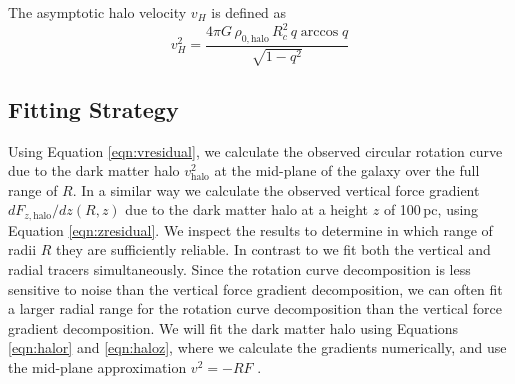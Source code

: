 \documentclass[useAMS,usenatbib]{mn2e}
\begin{document}
The asymptotic halo velocity $v_H$ is defined as 
\begin{equation}
v_H^2 = \frac{4\pi G\,\rho_{0,\textrm{halo}} \,R_c^2\, q \arccos q}{\sqrt{1-q^2}}\label{eqn:dmhalovelocity}
\end{equation}



\subsection{Fitting Strategy}

Using Equation \ref{eqn:vresidual}, we calculate the observed circular 
rotation curve due to the dark matter halo $v_\textrm{halo}^2$ at the 
mid-plane of the galaxy over the full range of $R$.
In a similar way we calculate the observed vertical force gradient  
$dF_{z,\textrm{halo}}/dz(R,z)$ due to the dark matter halo at a height $z$ 
of 100\,pc, using Equation \ref{eqn:zresidual}.
We inspect the results to determine in which range of radii $R$ they 
are sufficiently reliable.
In contrast to \citet{OBrien2010D} we fit both the vertical and radial 
tracers simultaneously.
Since the rotation curve decomposition is less sensitive to noise than 
the vertical force gradient decomposition, we can often fit a larger 
radial range for the rotation curve decomposition  than the vertical 
force gradient decomposition.
We will fit the dark matter halo using Equations \ref{eqn:halor} and 
\ref{eqn:haloz}, where we calculate the gradients numerically, and use 
the mid-plane approximation $v^2=-RF$ \citep{Kuijken1989A}.
\end{document}
